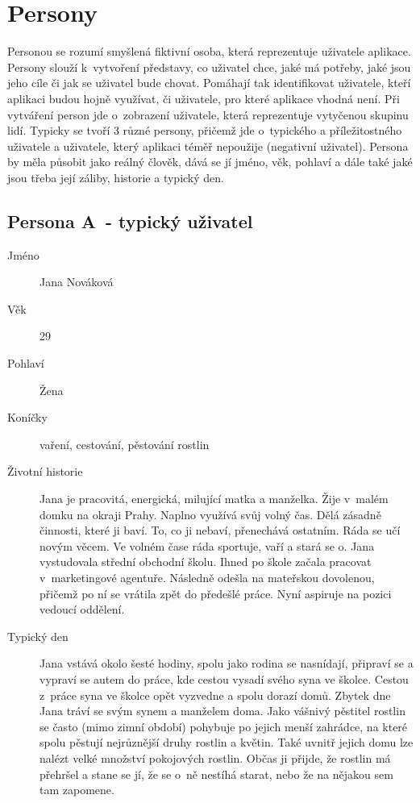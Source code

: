 \documentclass[thesis=M,czech]{FITthesis}[2019/12/23]
\begin{document}
\section{Persony}
Personou se rozumí smyšlená fiktivní osoba, která reprezentuje uživatele aplikace. Persony slouží k~vytvoření představy, co uživatel chce, jaké má potřeby, jaké jsou jeho cíle či jak se uživatel bude chovat. Pomáhají tak identifikovat uživatele, kteří aplikaci budou hojně využívat, či uživatele, pro které aplikace vhodná není. Při vytváření person jde o~zobrazení uživatele, která reprezentuje vytyčenou skupinu lidí. Typicky se tvoří 3 různé persony, přičemž jde o~typického a příležitostného uživatele a uživatele, který aplikaci téměř nepoužije (negativní uživatel). Persona by měla působit jako reálný člověk, dává se jí jméno, věk, pohlaví a dále také jaké jsou třeba její záliby, historie a typický den. \cite{personas-1, ui-design-steps}

\subsection{Persona A~- typický uživatel}
\begin{description}
    \item[Jméno] Jana Nováková
    \item[Věk] 29
    \item[Pohlaví] Žena
    \item[Koníčky] vaření, cestování, pěstování rostlin
    \item[Životní historie] Jana je pracovitá, energická, milující matka a manželka. Žije v~malém domku na okraji Prahy. Naplno využívá svůj volný čas. Dělá zásadně činnosti, které ji baví. To, co ji nebaví, přenechává ostatním. Ráda se učí novým věcem. Ve volném čase ráda sportuje, vaří a stará se o. Jana vystudovala střední obchodní školu. Ihned po škole začala pracovat v~marketingové agentuře. Následně odešla na mateřskou dovolenou, přičemž po ní se vrátila zpět do předešlé práce. Nyní aspiruje na pozici vedoucí oddělení.
    \item[Typický den] Jana vstává okolo šesté hodiny, spolu jako rodina se nasnídají, připraví se a vypraví se autem do práce, kde cestou vysadí svého syna ve školce. Cestou z~práce syna ve školce opět vyzvedne a spolu dorazí domů. Zbytek dne Jana tráví se svým synem a manželem doma. Jako vášnivý pěstitel rostlin se často (mimo zimní období) pohybuje po jejich menší zahrádce, na které spolu pěstují nejrůznější druhy rostlin a květin. Také uvnitř jejich domu lze nalézt velké množství pokojových rostlin. Občas ji přijde, že rostlin má přehršel a stane se jí, že se o~ně nestíhá starat, nebo že na nějakou sem tam zapomene.
\end{description}
\end{document}
